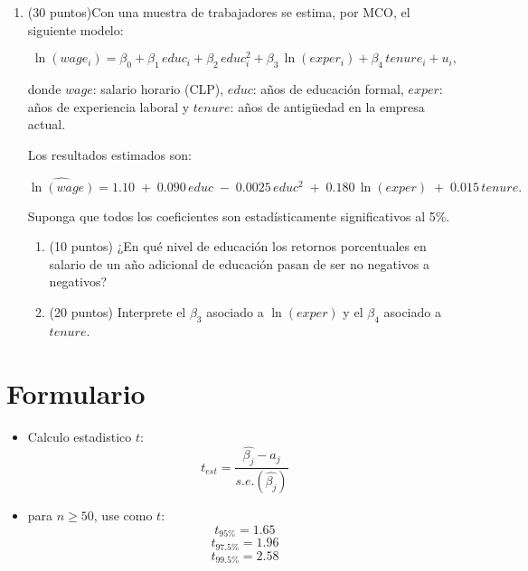 \documentclass[10pt,a4paper]{article}
\begin{document}
\begin{enumerate}
\item (30 puntos)Con una muestra de trabajadores se estima, por MCO, el siguiente modelo:

\begin{equation}
\label{eq:modelo}
\ln(wage_i)=\beta_0+\beta_1\,educ_i+\beta_2\,educ_i^2+\beta_3\,\ln(exper_i)+\beta_4\,tenure_i+u_i,
\end{equation}

donde $wage$: salario horario (CLP), $educ$: años de educación formal, $exper$: años de experiencia laboral y $tenure$: años de antigüedad en la empresa actual.

Los resultados estimados son:

\begin{equation}
\label{eq:estimada}
\widehat{\ln(wage)}=1.10 \;+\; 0.090\,educ \;-\; 0.0025\,educ^2 \;+\; 0.180\,\ln(exper) \;+\; 0.015\,tenure.
\end{equation}

Suponga que todos los coeficientes son estadísticamente significativos al 5\%.

\begin{enumerate}
    \item (10 puntos) ¿En qué nivel de educación los retornos porcentuales en salario de un año adicional de educación pasan de ser no negativos a negativos? 
    \item (20 puntos) Interprete el $\beta_3$ asociado a $\ln(exper)$ y el $\beta_4$ asociado a $tenure$. 
\end{enumerate}





\end{enumerate}


\newpage
\section{Formulario}
\begin{itemize}

\item Calculo estadistico $t$:
\[
t_{est}=\frac{\hat{\beta_j}-a_j}{s.e.(\hat{\beta_j})}
\]

\item para $n\geq50$, use como $t$:
\[
t_{95\%}=1.65 
\]
\[
t_{97.5\%}=1.96 
\]
\[
t_{99.5\%}=2.58
\]

\end{itemize}
 
\end{document}
